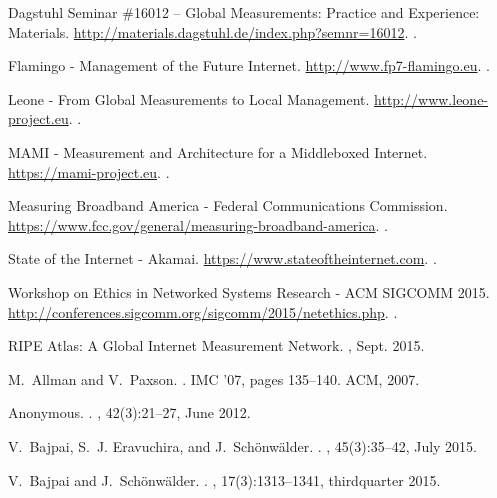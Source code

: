\documentclass{sigcomm-alternate}
\begin{document}
\begin{thebibliography}{10}

{Dagstuhl Seminar \#16012 – Global Measurements: Practice and Experience:
  Materials}.
\newblock \url{http://materials.dagstuhl.de/index.php?semnr=16012}.
.

{Flamingo - Management of the Future Internet}.
\newblock \url{http://www.fp7-flamingo.eu}.
.

{Leone - From Global Measurements to Local Management}.
\newblock \url{http://www.leone-project.eu}.
.

{MAMI - Measurement and Architecture for a Middleboxed Internet}.
\newblock \url{https://mami-project.eu}.
.

{Measuring Broadband America - Federal Communications Commission}.
\newblock \url{https://www.fcc.gov/general/measuring-broadband-america}.
.

{State of the Internet - Akamai}.
\newblock \url{https://www.stateoftheinternet.com}.
.

{Workshop on Ethics in Networked Systems Research - ACM SIGCOMM 2015}.
\newblock \url{http://conferences.sigcomm.org/sigcomm/2015/netethics.php}.
.

{RIPE Atlas: A Global Internet Measurement Network}.
, Sept. 2015.

M.~Allman and V.~Paxson.
.
\newblock IMC '07, pages 135--140. ACM, 2007.

Anonymous.
.
, 42(3):21--27, June 2012.

V.~Bajpai, S.~J. Eravuchira, and J.~Sch\"{o}nw\"{a}lder.
.
, 45(3):35--42, July 2015.

V.~Bajpai and J.~Sch\"onw\"alder.
.
, 17(3):1313--1341,
  thirdquarter 2015.


\end{thebibliography}
\end{document}
